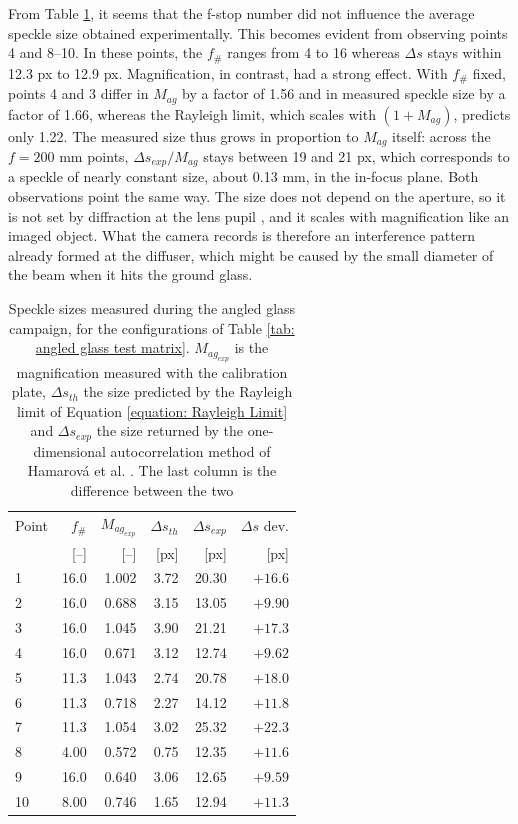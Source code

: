 From Table \ref{tab: angled glass speckle results}, it seems that the f-stop number did not influence the average speckle size obtained experimentally. This becomes evident from observing points 4 and 8--10. In these points, the $f_\#$ ranges from 4 to 16 whereas $\Delta s$ stays within 12.3 px to 12.9 px. Magnification, in contrast, had a strong effect. With $f_\#$ fixed, points 4 and 3 differ in $M_{ag}$ by a factor of 1.56 and in measured speckle size by a factor of 1.66, whereas the Rayleigh limit, which scales with $(1+M_{ag})$, predicts only 1.22. The measured size thus grows in proportion to $M_{ag}$ itself: across the $f = 200$ mm points, $\Delta s_{exp}/M_{ag}$ stays between 19 and 21 px, which corresponds to a speckle of nearly constant size, about 0.13 mm, in the in-focus plane. Both observations point the same way. The size does not depend on the aperture, so it is not set by diffraction at the lens pupil \cite{Goodman2020}, and it scales with magnification like an imaged object. What the camera records is therefore an interference pattern already formed at the diffuser, which might be caused by the small diameter of the beam when it hits the ground glass.

\begin{table}[htbp]
    \centering
    \caption[Speckle sizes of the angled glass campaign]{Speckle sizes measured during the angled glass campaign, for the configurations of Table \ref{tab: angled glass test matrix}. $M_{ag_{exp}}$ is the magnification measured with the calibration plate, $\Delta s_{th}$ the size predicted by the Rayleigh limit of Equation \ref{equation: Rayleigh Limit} and $\Delta s_{exp}$ the size returned by the one-dimensional autocorrelation method of Hamarová et al. \cite{Hamarova2016}. The last column is the difference between the two}
    \label{tab: angled glass speckle results}
    \begin{tabular}{lrrrrr}
        \toprule
        Point & $f_\#$ & $M_{ag_{exp}}$ &  $\Delta s_{th}$ & $\Delta s_{exp}$ & $\Delta s$ dev. \\
              & [--] & [--] & [px] & [px] & [px] \\
        \midrule
         1 & 16.0 & 1.002 &   3.72 &  20.30 & $+16.6$ \\
         2 & 16.0 & 0.688 &   3.15 &  13.05 & $+9.90$ \\
         3 & 16.0 & 1.045 &   3.90 &  21.21 & $+17.3$ \\
         4 & 16.0 & 0.671 &   3.12 &  12.74 & $+9.62$ \\
         5 & 11.3 & 1.043 &   2.74 &  20.78 & $+18.0$ \\
         6 & 11.3 & 0.718 &   2.27 &  14.12 & $+11.8$ \\
         7 & 11.3 & 1.054 &   3.02 &  25.32 & $+22.3$ \\
         8 &  4.00 & 0.572 &   0.75 &  12.35 & $+11.6$ \\
         9 & 16.0 & 0.640 &   3.06 &  12.65 & $+9.59$ \\
        10 &  8.00 & 0.746 &   1.65 &  12.94 & $+11.3$ \\
        \bottomrule
    \end{tabular}
\end{table}


